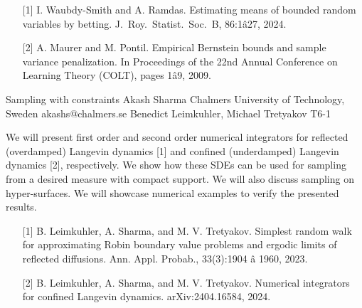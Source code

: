 \begin{talk}
\begin{enumerate}
	\item[{[1]}] I. Waubdy-Smith and A. Ramdas. Estimating means of bounded random
variables by betting. J.\ Roy.\ Statist.\ Soc.\ B, 86:1â27, 2024.
	\item[{[2]}] A. Maurer and M. Pontil. Empirical Bernstein bounds and sample variance penalization. In Proceedings of the 22nd Annual Conference
on Learning Theory (COLT), pages 1â9, 2009.
\end{enumerate}


\end{talk}

\begin{talk}
  {Sampling with constraints}%
  {Akash Sharma}%
  {Chalmers University of Technology, Sweden}%
  {akashs@chalmers.se}%
  {Benedict Leimkuhler, Michael Tretyakov}%
  {T6-1}%
			
 We will present first order and second order numerical integrators for reflected (overdamped) Langevin dynamics [1] and confined (underdamped) Langevin dynamics [2], respectively. We show how these SDEs can be used for sampling from a desired measure with compact support. We will also discuss sampling on hyper-surfaces. We will showcase numerical examples to verify the presented results.  

\medskip  

\begin{enumerate}
	\item[{[1]}] B. Leimkuhler, A. Sharma, and M. V. Tretyakov. Simplest random walk for approximating Robin boundary
value problems and ergodic limits of reflected diffusions. Ann. Appl. Probab., 33(3):1904 â 1960, 2023.
	\item[{[2]}] B. Leimkuhler, A. Sharma, and M. V. Tretyakov. Numerical integrators for confined Langevin dynamics.  
arXiv:2404.16584, 2024.
\end{enumerate}


\end{talk}

